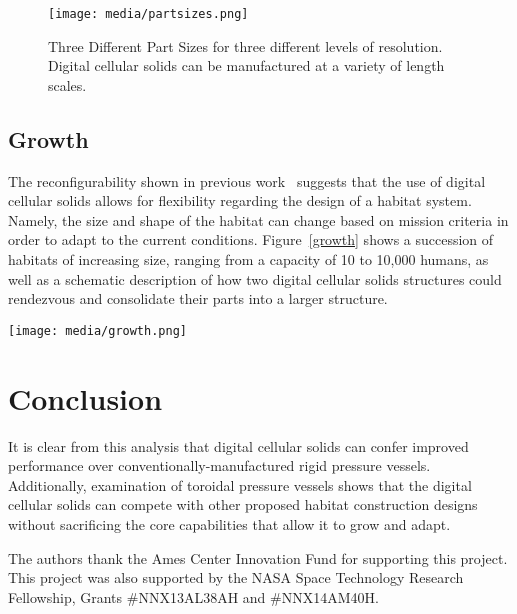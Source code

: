 \documentclass[twocolumn,letterpaper]{IEEEAerospaceCLS}  %
\begin{document}
\begin{figure}\label{partsizes}
\centering
\texttt{[image: media/partsizes.png]}\\
\caption{Three Different Part Sizes for three different levels of resolution. Digital cellular solids can be manufactured at a variety of length scales.}
\end{figure}

\subsection{Growth}
The reconfigurability shown in previous work~\cite{jenett2016meso} suggests that the use of digital cellular solids allows for flexibility regarding the design of a habitat system. Namely, the size and shape of the habitat can change based on mission criteria in order to adapt to the current conditions. Figure~\ref{growth} shows a succession of habitats of increasing size, ranging from a capacity of 10 to 10,000 humans, as well as a schematic description of how two digital cellular solids structures could rendezvous and consolidate their parts into a larger structure.

\begin{figure*}\label{growth}
\centering
\texttt{[image: media/growth.png]}\\
\caption{The left figure shows different size structures, from a ten-person capsule to a 10,000 person colony, and the morphologies which represent the most efficient configuration of mass at each scale\protect\cite{johnson1977space}. The right figure shows a schematic representation of how a structure composed of digital cellular solids could transition from one morphology to another.}
\end{figure*}

\section{Conclusion}
It is clear from this analysis that digital cellular solids can confer improved performance over conventionally-manufactured rigid pressure vessels. Additionally, examination of toroidal pressure vessels shows that the digital cellular solids can compete with other proposed habitat construction designs without sacrificing the core capabilities that allow it to grow and adapt.


\acknowledgments
The authors thank the Ames Center Innovation Fund for supporting this project. This project was also supported by the NASA Space Technology Research Fellowship, Grants \#NNX13AL38AH and \#NNX14AM40H.
\end{document}
